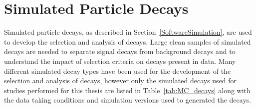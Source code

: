 \section{Simulated Particle Decays}
\label{sec:MCsamples}
Simulated particle decays, as described in Section~\ref{SoftwareSimulation}, are used to develop the selection and analysis of \bmumu decays. Large clean samples of simulated decays are needed to separate signal decays from background decays and to understand the impact of selection criteria on decays present in data. 
Many different simulated decay types have been used for the development of the selection and analysis of \bmumu decays, however only the simulated decays used for studies performed for this thesis are listed in Table~\ref{tab:MC_decays} along with the data taking conditions and simulation versions used to generated the decays.
